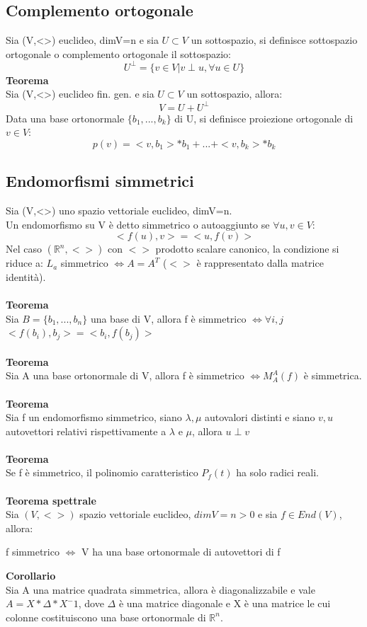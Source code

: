 \documentclass{article}
\newcommand{\R}{\mathds{R}}
\begin{document}
\subsection{Complemento ortogonale}
Sia (V,<>) euclideo, dimV=n e sia $U\subset V$ un sottospazio, si definisce sottospazio ortogonale o complemento ortogonale il sottospazio: 
$$U^\perp =\{v\in V|v\perp u,\forall u\in U\} $$
\textbf{Teorema}\\
Sia (V,<>) euclideo fin. gen. e sia $U\subset V$ un sottospazio, allora:
$$V=U+U^\perp $$
Data una base ortonormale $\{b_1,...,b_k\}$ di U, si definisce proiezione ortogonale di $v\in V$: $$p(v)=<v,b_1>*b_1+...+<v,b_k>*b_k$$

\subsection{Endomorfismi simmetrici}
Sia (V,<>) uno spazio vettoriale euclideo, dimV=n.\\
Un endomorfismo su V è detto simmetrico o autoaggiunto se $\forall u,v\in V$:
$$<f(u),v>=<u,f(v)> $$
Nel caso $(\R^n,<>)$ con $<>$ prodotto scalare canonico, la condizione si riduce a: $L_a$ simmetrico $\Leftrightarrow A=A^T$ ($<>$ è rappresentato dalla matrice identità).\\\\
\textbf{Teorema}\\
Sia $B=\{b_1,...,b_n\}$ una base di V, allora f è simmetrico $\Leftrightarrow \forall i,j$ $<f(b_i),b_j>=<b_i,f(b_j)>$\\\\
\textbf{Teorema}\\
Sia A una base ortonormale di V, allora f è simmetrico $\Leftrightarrow M_A^A(f)$ è simmetrica.\\\\
\textbf{Teorema}\\
Sia f un endomorfismo simmetrico, siano $\lambda,\mu$ autovalori distinti e siano $v,u$ autovettori relativi rispettivamente a $\lambda$ e $\mu$, allora $u\perp v$\\\\
\textbf{Teorema}\\
Se f è simmetrico, il polinomio caratteristico $P_f(t)$ ha solo radici reali.\\\\
\textbf{Teorema spettrale}\\
Sia $(V,<>)$ spazio vettoriale euclideo, $dimV=n>0$ e sia $f\in End(V)$, allora:
\begin{center}
    f simmetrico $\Leftrightarrow$ V ha una base ortonormale di autovettori di f
\end{center}
\textbf{Corollario}\\
Sia A una matrice quadrata simmetrica, allora è diagonalizzabile e vale $A=X*\Delta*X^-1$, dove $\Delta$ è una matrice diagonale e X è una matrice le cui colonne costituiscono una base ortonormale di $\R^n$.
\end{document}
